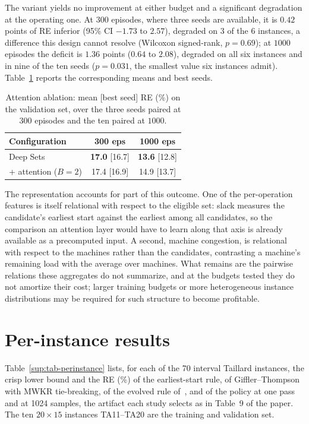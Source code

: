 \documentclass[preprint,authoryear,12pt]{elsarticle}
\begin{document}
The variant yields no improvement at either budget and a significant
degradation at the operating one. At $300$ episodes, where three
seeds are available, it is $0.42$ points of RE inferior (95\% CI
$-1.73$ to $2.57$), degraded on 3 of the 6 instances, a difference
this design cannot resolve (Wilcoxon signed-rank, $p=0.69$); at
$1000$ episodes the deficit is $1.36$ points ($0.64$ to $2.08$),
degraded on all six instances and in nine of the ten seeds
($p=0.031$, the smallest value six instances admit).
Table~\ref{sup:tab-attn} reports the corresponding means and best
seeds.

\begin{table}[!htb]
\centering\small
\caption{Attention ablation: mean [best seed] RE (\%) on the
validation set, over the three seeds paired at $300$ episodes and the
ten paired at $1000$.}
\label{sup:tab-attn}
\begin{tabular}{lcc}
\toprule
Configuration & 300 eps & 1000 eps \\
\midrule
Deep Sets & \textbf{17.0} [16.7] & \textbf{13.6} [12.8] \\
+ attention ($B{=}2$) & 17.4 [16.9] & 14.9 [13.7] \\
\bottomrule
\end{tabular}
\end{table}

The representation accounts for part of this outcome. One of the
per-operation features is itself relational with respect to the
eligible set: slack measures the candidate's earliest start against
the earliest among all candidates, so the comparison an attention
layer would have to learn along that axis is already available as a
precomputed input. A second, machine congestion, is relational with
respect to the machines rather than the candidates, contrasting a
machine's remaining load with the average over machines. What remains
are the pairwise relations these aggregates do not summarize, and at
the budgets tested they do not amortize their cost; larger training
budgets or more heterogeneous instance distributions may be required
for such structure to become profitable.

\section{Per-instance results}
\label{sup:perinstance}

Table~\ref{sup:tab-perinstance} lists, for each of the 70 interval
Taillard instances, the crisp lower bound and the RE (\%) of the
earliest-start rule, of Giffler--Thompson with MWKR tie-breaking, of
the evolved rule of~\citet{DiazGP2026}, and of the policy at one pass
and at 1024 samples, the artifact each study selects as in Table~9 of
the paper. The ten $20{\times}15$ instances TA11--TA20 are the
training and validation set.
\end{document}
